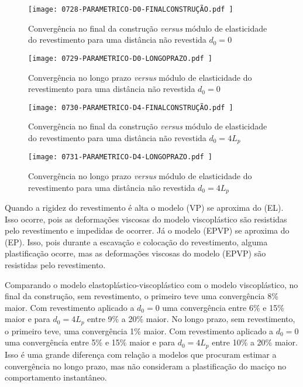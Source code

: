 \begin{figure}[H]
	\begin{center}
		\texttt{[image: 0728-PARAMETRICO-D0-FINALCONSTRUÇÃO.pdf
		]}
	\end{center}
	\caption{\label{PARAMETRICO-D0-FINALCONSTRUÇÃO}Convergência no final da construção \textit{versus} módulo de elasticidade do revestimento para uma distância não revestida $d_0=0$}
\end{figure}

\begin{figure}[H]
	\begin{center}
		\texttt{[image: 0729-PARAMETRICO-D0-LONGOPRAZO.pdf
		]}
	\end{center}
	\caption{\label{PARAMETRICO-D0-LONGOPRAZO}Convergência no longo prazo \textit{versus} módulo de elasticidade do revestimento para uma distância não revestida $d_0=0$}
\end{figure}

\begin{figure}[H]
	\begin{center}
		\texttt{[image: 0730-PARAMETRICO-D4-FINALCONSTRUÇÃO.pdf
		]}
	\end{center}
	\caption{\label{PARAMETRICO-D4-FINALCONSTRUÇÃO}Convergência no final da construção \textit{versus} módulo de elasticidade do revestimento para uma distância não revestida $d_0=4L_p$}
\end{figure}

\begin{figure}[H]
	\begin{center}
		\texttt{[image: 0731-PARAMETRICO-D4-LONGOPRAZO.pdf
		]}
	\end{center}
	\caption{\label{PARAMETRICO-D4-LONGOPRAZO}Convergência no longo prazo \textit{versus} módulo de elasticidade do revestimento para uma distância não revestida $d_0=4L_p$}
\end{figure}

Quando a rigidez do revestimento é alta o modelo (VP) se aproxima do (EL). Isso ocorre, pois as deformações viscosas do modelo viscoplástico são resistidas pelo revestimento e impedidas de ocorrer. Já o modelo (EPVP) se aproxima do (EP). Isso, pois durante a escavação e colocação do revestimento, alguma plastificação ocorre, mas as deformações viscosas do modelo (EPVP) são resistidas pelo revestimento.

Comparando o modelo elastoplástico-viscoplástico com o modelo viscoplástico, no final da construção, sem revestimento, o primeiro teve uma convergência 8\% maior. Com revestimento aplicado a $d_0=0$ uma convergência entre 6\% e 15\% maior e para $d_0=4L_p$ entre 9\% a 20\% maior. No longo prazo, sem revestimento, o primeiro teve, uma convergência 1\% maior. Com revestimento aplicado a $d_0=0$ uma convergência entre 5\% e 15\% maior e para $d_0=4L_p$ entre 10\% a 20\% maior. Isso é uma grande diferença com relação a modelos que procuram estimar a convergência no longo prazo, mas não consideram a plastificação do maciço no comportamento instantâneo.

